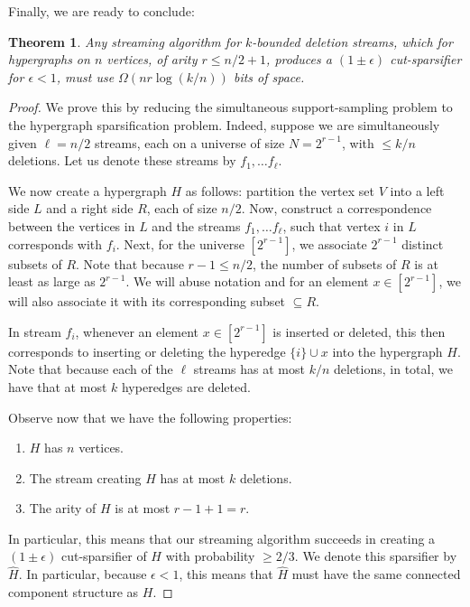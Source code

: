 \documentclass[11pt]{article}
\newtheorem{theorem}{Theorem}[section]
\theoremstyle{definition}
\newcommand{\eps}{\epsilon}
\begin{document}
Finally, we are ready to conclude:

\begin{theorem}
    Any streaming algorithm for $k$-bounded deletion streams, which for hypergraphs on $n$ vertices, of arity $r \leq n/2+1$, produces a $(1 \pm \eps)$ cut-sparsifier for $\eps < 1$, must use $\Omega(n r \log(k/n))$ bits of space.
\end{theorem}

\begin{proof}
    We prove this by reducing the simultaneous support-sampling problem to the hypergraph sparsification problem. Indeed, suppose we are simultaneously given $\ell = n/2$ streams, each on a universe of size $N = 2^{r-1}$, with $\leq k/n$ deletions. Let us denote these streams by $f_1, \dots f_{\ell}$.

    We now create a hypergraph $H$ as follows: partition the vertex set $V$ into a left side $L$ and a right side $R$, each of size $n/2$. Now, construct a correspondence between the vertices in $L$ and the streams $f_1, \dots f_{\ell}$, such that vertex $i$ in $L$ corresponds with $f_i$. Next, for the universe $[2^{r-1}]$, we associate $2^{r-1}$ distinct subsets of $R$. Note that because $r-1 \leq n/2$, the number of subsets of $R$ is at least as large as $2^{r-1}$. We will abuse notation and for an element $x \in [2^{r-1}]$, we will also associate it with its corresponding subset $\subseteq R$.
    
    In stream $f_i$, whenever an element $x \in [2^{r-1}]$ is inserted or deleted, this then corresponds to inserting or deleting the hyperedge $\{ i \} \cup x$ into the hypergraph $H$. Note that because each of the $\ell$ streams has at most $k/n$ deletions, in total, we have that at most $k$ hyperedges are deleted. 

    Observe now that we have the following properties:
    \begin{enumerate}
        \item $H$ has $n$ vertices.
        \item The stream creating $H$ has at most $k$ deletions.
        \item The arity of $H$ is at most $r-1 + 1 = r$.
    \end{enumerate}
    In particular, this means that our streaming algorithm succeeds in creating a $(1 \pm \eps)$ cut-sparsifier of $H$ with probability $\geq 2/3$. We denote this sparsifier by $\hat{H}$. In particular, because $\eps <1$, this means that $\hat{H}$ must have the same connected component structure as $H$. 


\end{proof}
\end{document}
